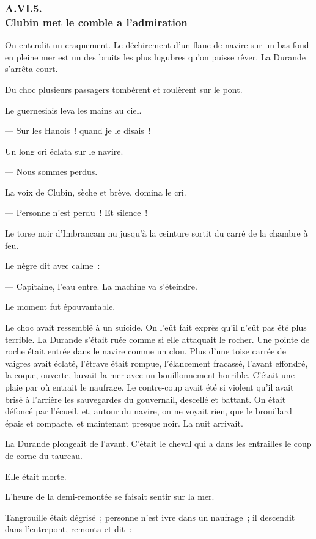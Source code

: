 \documentclass[french,twoside]{book} %
\begin{document}
 \subsubsection[{A.VI.5. Clubin met le comble a l’admiration}]{A.VI.5. \\
Clubin met le comble a l’admiration}
\noindent On entendit un craquement. Le déchirement d’un flanc de navire sur un bas-fond en pleine mer est un des bruits les plus lugubres qu’on puisse rêver. La Durande s’arrêta court.\par
Du choc plusieurs passagers tombèrent et roulèrent sur le pont.\par
Le guernesiais leva les mains au ciel.\par
— Sur les Hanois ! quand je le disais !\par
Un long cri éclata sur le navire.\par
— Nous sommes perdus.\par
La voix de Clubin, sèche et brève, domina le cri.\par
— Personne n’est perdu ! Et silence !\par
Le torse noir d’Imbrancam nu jusqu’à la ceinture sortit du carré de la chambre à feu.\par
Le nègre dit avec calme :\par
— Capitaine, l’eau entre. La machine va s’éteindre.\par
Le moment fut épouvantable.\par
Le choc avait ressemblé à un suicide. On l’eût fait  exprès qu’il n’eût pas été plus terrible. La Durande s’était ruée comme si elle attaquait le rocher. Une pointe de roche était entrée dans le navire comme un clou. Plus d’une toise carrée de vaigres avait éclaté, l’étrave était rompue, l’élancement fracassé, l’avant effondré, la coque, ouverte, buvait la mer avec un bouillonnement horrible. C’était une plaie par où entrait le naufrage. Le contre-coup avait été si violent qu’il avait brisé à l’arrière les sauvegardes du gouvernail, descellé et battant. On était défoncé par l’écueil, et, autour du navire, on ne voyait rien, que le brouillard épais et compacte, et maintenant presque noir. La nuit arrivait.\par
La Durande plongeait de l’avant. C’était le cheval qui a dans les entrailles le coup de corne du taureau.\par
Elle était morte.\par
L’heure de la demi-remontée se faisait sentir sur la mer.\par
Tangrouille était dégrisé ; personne n’est ivre dans un naufrage ; il descendit dans l’entrepont, remonta et dit :\par
\end{document}

